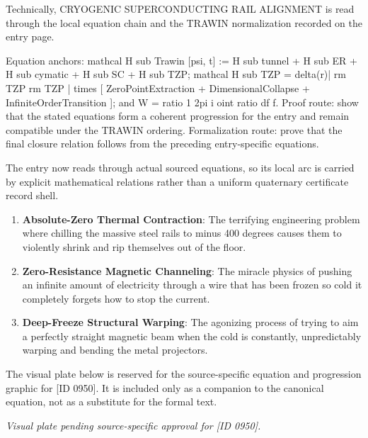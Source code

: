 Technically, CRYOGENIC SUPERCONDUCTING RAIL ALIGNMENT is read through the local equation chain and the TRAWIN normalization recorded on the entry page.

Equation anchors: mathcal H sub Trawin [psi, t] := H sub tunnel + H sub ER + H sub cymatic + H sub SC + H sub TZP; mathcal H sub TZP = delta(r)| rm TZP rm TZP | times [ ZeroPointExtraction + DimensionalCollapse + InfiniteOrderTransition ]; and W = ratio 1 2pi i oint ratio df f. Proof route: show that the stated equations form a coherent progression for the entry and remain compatible under the TRAWIN ordering. Formalization route: prove that the final closure relation follows from the preceding entry-specific equations.

The entry now reads through actual sourced equations, so its local arc is carried by explicit mathematical relations rather than a uniform quaternary certificate record shell.
\endgroup

\begin{enumerate}[leftmargin=1.6em,itemsep=6pt,topsep=4pt]
\item \textbf{Absolute-Zero Thermal Contraction}: The terrifying engineering problem where chilling the massive steel rails to minus 400 degrees causes them to violently shrink and rip themselves out of the floor.
\item \textbf{Zero-Resistance Magnetic Channeling}: The miracle physics of pushing an infinite amount of electricity through a wire that has been frozen so cold it completely forgets how to stop the current.
\item \textbf{Deep-Freeze Structural Warping}: The agonizing process of trying to aim a perfectly straight magnetic beam when the cold is constantly, unpredictably warping and bending the metal projectors.
\end{enumerate}

\begingroup\footnotesize\sloppy
The visual plate below is reserved for the source-specific equation and progression graphic for [ID 0950]. It is included only as a companion to the canonical equation, not as a substitute for the formal text.
\par\endgroup
\begingroup\footnotesize\itshape
Visual plate pending source-specific approval for [ID 0950].
\par\endgroup

